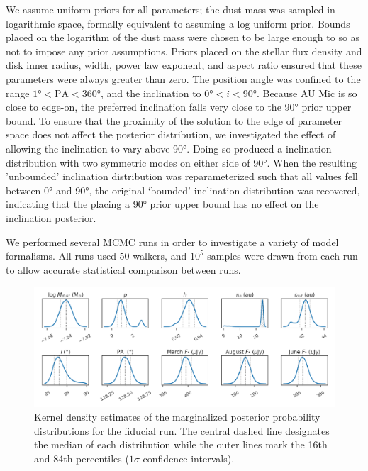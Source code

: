 \documentclass[modern]{aastex62}
\begin{document}
We assume uniform priors for all parameters; the dust mass was sampled in logarithmic space, formally equivalent to assuming a log uniform prior.
Bounds placed on the logarithm of the dust mass were chosen to be large enough to so as not to impose any prior assumptions.
Priors placed on the stellar flux density and disk inner radius, width, power law exponent, and aspect ratio ensured that these parameters were always greater than zero.
The position angle was confined to the range $\ang{1} < \text{PA} < \ang{360}$, and the inclination to $\ang{0} < i < \ang{90}$.
Because AU Mic is so close to edge-on, the preferred inclination falls very close to the \ang{90} prior upper bound. 
To ensure that the proximity of the solution to the edge of parameter space does not affect the posterior distribution, we investigated the effect of allowing the inclination to vary above \ang{90}. 
Doing so produced a inclination distribution with two symmetric modes on either side of \ang{90}. 
When the resulting ’unbounded’ inclination distribution was reparameterized such that all values fell between \ang{0} and \ang{90}, the original ‘bounded’ inclination distribution was recovered, indicating that the placing a \ang{90} prior upper bound has no effect on the inclination posterior.

We performed several MCMC runs in order to investigate a variety of model formalisms. 
All runs used 50 walkers, and $10^5$ samples were drawn from each run to allow accurate statistical comparison between runs.


\begin{figure}
  \centering
  \includegraphics[width=\linewidth]{../figures/fiducial_kde}
  \caption{Kernel density estimates of the marginalized posterior probability distributions for the fiducial run. The central dashed line designates the median of each distribution while the outer lines mark the 16th and 84th percentiles ($1\sigma$ confidence intervals).}
  \label{fig: kde}
\end{figure}
\end{document}
